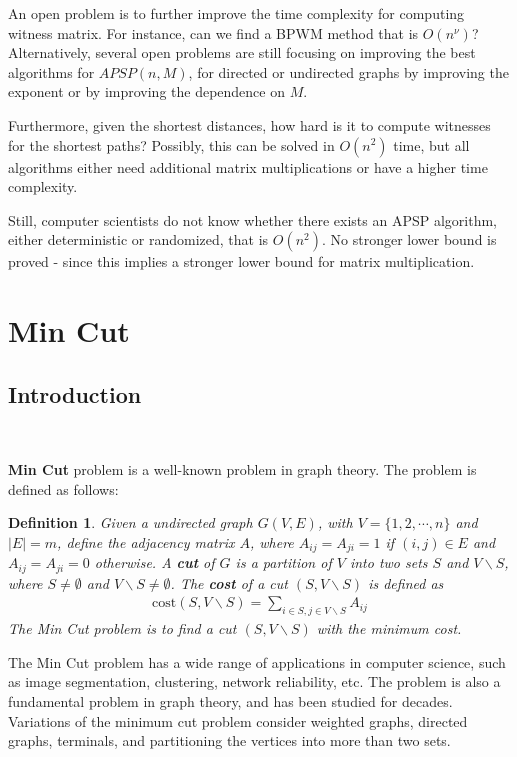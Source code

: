 \documentclass[11pt]{article}
\theoremstyle{plain}
\newtheorem{definition}{Definition}[section]
\begin{document}
An open problem is to further improve the time complexity for computing witness matrix. For instance, can we find a BPWM method that is $O(n^\nu)$? Alternatively, several open problems are still focusing on improving the best algorithms for $APSP(n, M)$, for directed or undirected graphs by improving the exponent or by improving the dependence on $M$.

Furthermore, given the shortest distances, how hard is it to compute witnesses for the shortest paths? Possibly, this can be solved in $O(n^2)$ time, but all algorithms either need additional matrix multiplications or have a higher time complexity.

Still, computer scientists do not know whether there exists an APSP algorithm, either deterministic or randomized, that is $O(n^2)$. No stronger lower bound is proved - since this implies a stronger lower bound for matrix multiplication.
\section{Min Cut}

\subsection{Introduction}\

\textbf{Min Cut} problem is a well-known problem in graph theory. The problem is defined as follows: 
\begin{definition}
    Given a  undirected graph $G(V,E)$, with $V=\{1,2,\cdots,n\}$ and $|E|=m$, define the adjacency matrix $A$, where $A_{ij}=A_{ji}=1$ if $(i,j)\in E$ and $A_{ij}=A_{ji}=0$ otherwise. A \textbf{cut} of $G$ is a partition of $V$ into two sets $S$ and $V\backslash S$, where $S\neq\emptyset$ and $V\backslash S\neq\emptyset$. The \textbf{cost} of a cut $(S,V\backslash S)$ is defined as
    \begin{align*}
        \text{cost}(S,V\backslash S)=\sum_{i\in S, j\in V\backslash S}A_{ij}
    \end{align*}
    The Min Cut problem is to find a cut $(S,V\backslash S)$ with the minimum cost.
\end{definition}

The Min Cut problem has a wide range of applications in computer science, such as image segmentation, clustering, network reliability, etc. The problem is also a fundamental problem in graph theory, and has been studied for decades. Variations of the minimum cut problem consider weighted graphs, directed graphs, terminals, and partitioning the vertices into more than two sets.
\end{document}
